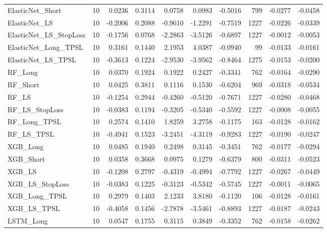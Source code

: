 \begin{tabular}{llrrrrrrrr}
\cline{1-10}
ElasticNet\_Short & 10 & 0.0236 & 0.3114 & 0.0758 & 0.0983 & -0.5016 & 799 & -0.0277 & -0.0458 \\
\cline{1-10}
ElasticNet\_LS & 10 & -0.2006 & 0.2088 & -0.9610 & -1.2291 & -0.7519 & 1227 & -0.0226 & -0.0339 \\
\cline{1-10}
ElasticNet\_LS\_StopLoss & 10 & -0.1756 & 0.0768 & -2.2863 & -3.5126 & -0.6897 & 1227 & -0.0012 & -0.0053 \\
\cline{1-10}
ElasticNet\_Long\_TPSL & 10 & 0.3161 & 0.1440 & 2.1953 & 4.0387 & -0.0940 & 99 & -0.0133 & -0.0161 \\
\cline{1-10}
ElasticNet\_LS\_TPSL & 10 & -0.3613 & 0.1224 & -2.9530 & -3.9562 & -0.8464 & 1275 & -0.0153 & -0.0200 \\
\cline{1-10}
RF\_Long & 10 & 0.0370 & 0.1924 & 0.1922 & 0.2427 & -0.3341 & 762 & -0.0164 & -0.0290 \\
\cline{1-10}
RF\_Short & 10 & 0.0425 & 0.3811 & 0.1116 & 0.1530 & -0.6204 & 969 & -0.0318 & -0.0534 \\
\cline{1-10}
RF\_LS & 10 & -0.1254 & 0.2944 & -0.4260 & -0.5120 & -0.7671 & 1227 & -0.0280 & -0.0468 \\
\cline{1-10}
RF\_LS\_StopLoss & 10 & -0.0383 & 0.1194 & -0.3205 & -0.5340 & -0.5592 & 1227 & -0.0008 & -0.0055 \\
\cline{1-10}
RF\_Long\_TPSL & 10 & 0.2574 & 0.1410 & 1.8259 & 3.2758 & -0.1175 & 163 & -0.0128 & -0.0162 \\
\cline{1-10}
RF\_LS\_TPSL & 10 & -0.4941 & 0.1523 & -3.2451 & -4.3119 & -0.9283 & 1227 & -0.0190 & -0.0247 \\
\cline{1-10}
XGB\_Long & 10 & 0.0485 & 0.1940 & 0.2498 & 0.3145 & -0.3451 & 762 & -0.0177 & -0.0294 \\
\cline{1-10}
XGB\_Short & 10 & 0.0358 & 0.3668 & 0.0975 & 0.1279 & -0.6379 & 800 & -0.0311 & -0.0523 \\
\cline{1-10}
XGB\_LS & 10 & -0.1208 & 0.2797 & -0.4319 & -0.4994 & -0.7792 & 1227 & -0.0267 & -0.0449 \\
\cline{1-10}
XGB\_LS\_StopLoss & 10 & -0.0383 & 0.1225 & -0.3123 & -0.5342 & -0.5745 & 1227 & -0.0011 & -0.0065 \\
\cline{1-10}
XGB\_Long\_TPSL & 10 & 0.2979 & 0.1403 & 2.1233 & 3.8180 & -0.1120 & 106 & -0.0128 & -0.0161 \\
\cline{1-10}
XGB\_LS\_TPSL & 10 & -0.4058 & 0.1456 & -2.7878 & -3.5461 & -0.8893 & 1227 & -0.0187 & -0.0243 \\
\cline{1-10}
LSTM\_Long & 10 & 0.0547 & 0.1755 & 0.3115 & 0.3849 & -0.3352 & 762 & -0.0158 & -0.0262 \\

\end{tabular}
